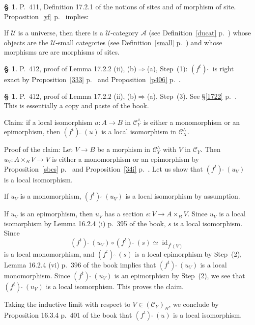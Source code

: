 \documentclass[12pt]{article}
\theoremstyle{remark}
\theoremstyle{definition}
\newtheorem{s}[thm]{\S}
\newcommand{\A}{\mathcal A}
\newcommand{\C}{\mathcal C}
\newcommand{\U}{\mathcal U}
\newcommand{\fthat}{(f^t)\ \widehat{}\ }
\newcommand{\then}{\Rightarrow}
\DeclareMathOperator{\id}{id}
\begin{document}
\begin{s}
P.~411, Definition 17.2.1 of the notions of sites and of morphism of site. Proposition~\ref{yf} p.~\pageref{yf} implies:

If $\U$ is a universe, then there is a $\U$-category $\A$ (see Definition~\ref{ducat} p.~\pageref{ducat}) whose objects are the $\U$-small categories (see Definition~\ref{small} p.~\pageref{small}) and whose morphisms are are morphisms of sites.
\end{s}

%

\begin{s}
P.~412, proof of Lemma 17.2.2 (ii), (b)$\then$(a), Step~(1): $\fthat$ is right exact by Proposition~\ref{333} p.~\pageref{333} and Proposition~\ref{p406} p.~\pageref{p406}.
\end{s}

%

\begin{s}
P.~412, proof of Lemma 17.2.2 (ii), (b)$\then$(a), Step~(3). See \S\ref{1722} p.~\pageref{1722}. This is essentially a copy and paste of the book.

Claim: if a local isomorphism $u:A\to B$ in $\C_Y^\wedge$ is either a monomorphism or an epimorphism, then $\fthat(u)$ is a local isomorphism in $\C_X^\wedge$. 

Proof of the claim: Let $V\to B$ be a morphism in $\C_Y^\wedge$ with $V$ in $\C_Y$. Then $u_V: A\times_BV\to V$ is either a monomorphism or an epimorphism by Proposition~\ref{sbcs} p.~\pageref{sbcs} and Proposition~\ref{34i} p.~\pageref{34i}. Let us show that $\fthat(u_V)$ is a local isomorphism. 

If $u_V$ is a monomorphism, $\fthat(u_V)$ is a local isomorphism by assumption. 

If $u_V$ is an epimorphism, then $u_V$ has a section $s:V\to A\times_BV$. Since $u_V$ is a local isomorphism by Lemma 16.2.4 (i) p.~395 of the book, $s$ is a local isomorphism. Since 
$$
\fthat(u_V)\circ\fthat(s)\simeq\id_{f^t(V)}
$$ 
is a local monomorphism, and $\fthat(s)$ is a local epimorphism by Step~(2), Lemma 16.2.4 (vi) p.~396 of the book implies that $\fthat(u_V)$ is a local monomorphism. Since $\fthat(u_V)$ is an epimorphism by Step~(2), we see that $\fthat(u_V)$ is a local isomorphism. This proves the claim.

Taking the inductive limit with respect to $V\in(\C_Y)_B$, we conclude by Proposition 16.3.4 p.~401 of the book that $\fthat(u)$ is a local isomorphism.
\end{s}
\end{document}
